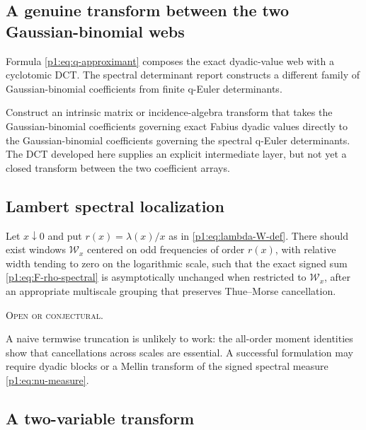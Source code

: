 \documentclass[11pt,oneside]{article}
\theoremstyle{definition}
\theoremstyle{remark}
\newcommand{\openstatus}{\textcolor{conjectureorange}{\textsc{Open or conjectural.}}}
\begin{document}
\subsection{A genuine transform between the two Gaussian-binomial webs}

Formula \eqref{p1:eq:q-approximant} composes the exact dyadic-value web with a
cyclotomic DCT.  The spectral determinant report constructs a different family
of Gaussian-binomial coefficients from finite q-Euler determinants.

\begin{problem}\label{p1:prob:two-q-webs}
Construct an intrinsic matrix or incidence-algebra transform that takes the
Gaussian-binomial coefficients governing exact Fabius dyadic values directly
to the Gaussian-binomial coefficients governing the spectral q-Euler
determinants.  The DCT developed here supplies an explicit intermediate layer,
but not yet a closed transform between the two coefficient arrays.
\end{problem}

\subsection{Lambert spectral localization}

\begin{conjecture}\label{p1:conj:Lambert-localization}
Let $x\downarrow0$ and put $r(x)=\lambda(x)/x$ as in
\eqref{p1:eq:lambda-W-def}.  There should exist windows
$\mathcal W_x$ centered on odd frequencies of order $r(x)$, with relative width
tending to zero on the logarithmic scale, such that the exact signed sum
\eqref{p1:eq:F-rho-spectral} is asymptotically unchanged when restricted to
$\mathcal W_x$, after an appropriate multiscale grouping that preserves
Thue--Morse cancellation.

\smallskip\noindent\openstatus
\end{conjecture}

A naive termwise truncation is unlikely to work: the all-order moment identities
show that cancellations across scales are essential.  A successful formulation
may require dyadic blocks or a Mellin transform of the signed spectral measure
\eqref{p1:eq:nu-measure}.

\subsection{A two-variable transform}
\end{document}
